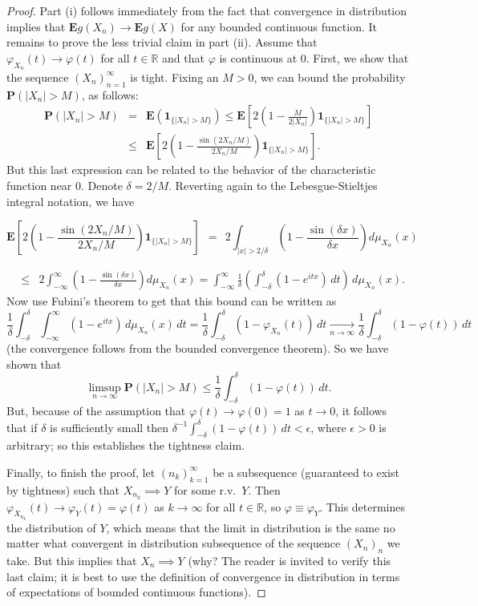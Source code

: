 \documentclass[12pt]{article}
\newcommand{\R}{\mathbb{R}}
\newcommand{\prob}{\mathbf{P}}
\newcommand{\expec}{\mathbf{E}}
\newcommand{\ind}{\textbf{1}}
\theoremstyle{example}
\begin{document}
\begin{proof} Part (i) follows immediately from the fact that convergence in distribution implies that $\expec g(X_n)\to \expec g(X)$ for any bounded continuous function. It remains to prove the less trivial claim in part (ii). Assume that $\varphi_{X_n}(t)\to \varphi(t)$ for all $t\in\R$ and that $\varphi$ is continuous at $0$. First, we show that the sequence $(X_n)_{n=1}^\infty$ is tight. Fixing an $M>0$, we can bound the probability $\prob(|X_n|>M)$, as follows:
\begin{eqnarray*} \prob(|X_n|>M) &=& \expec\left( \ind_{\{|X_n|>M\}}\right) \le
\expec \left[ 2 \left( 1-\frac{M}{2|X_n|} \right) \ind_{\{|X_n|>M\}}\right]
\\ &\le&
\expec \left[ 2 \left( 1-\frac{\sin(2X_n/M)}{2X_n/M} \right) \ind_{\{|X_n|>M\}}\right].
\end{eqnarray*}
But this last expression can be related to the behavior of the characteristic function near $0$. Denote $\delta=2/M$. Reverting again to the Lebesgue-Stieltjes integral notation, we have
\begin{samepage}
$$
\expec \left[ 2 \left( 1-\frac{\sin(2X_n/M)}{2X_n/M} \right) \ind_{\{|X_n|>M\}}\right]
\ \ =\ \  2\int_{|x|>2/\delta} \left(1-\frac{\sin (\delta x)}{\delta x}\right) d\mu_{X_n}(x) 
$$

\vspace{-16.0pt}
\begin{eqnarray*} 
&\le& 2\int_{-\infty}^\infty \left(1-\frac{\sin (\delta x)}{\delta x}\right) d\mu_{X_n}(x) 
= \int_{-\infty}^\infty \frac{1}{\delta}\left(\int_{-\delta}^\delta (1-e^{itx})\,dt\right)\,d\mu_{X_n}(x).
\end{eqnarray*}
Now use Fubini's theorem to get that this bound can be written as
$$
\frac{1}{\delta} \int_{-\delta}^\delta \int_{-\infty}^\infty (1-e^{itx})\,d\mu_{X_n}(x)\,dt
=\frac{1}{\delta} \int_{-\delta}^\delta (1-\varphi_{X_n}(t))\,dt
\xrightarrow[n\to\infty]{} \frac{1}{\delta} \int_{-\delta}^\delta (1-\varphi(t))\,dt
$$
(the convergence follows from the bounded convergence theorem).
So we have shown that
$$ \limsup_{n\to\infty} \prob(|X_n|>M) \le \frac{1}{\delta} \int_{-\delta}^\delta (1-\varphi(t))\,dt. $$
But, because of the assumption that $\varphi(t)\to \varphi(0)=1$ as $t\to 0$, it follows that if $\delta$ is sufficiently small then
$ \delta^{-1} \int_{-\delta}^\delta (1-\varphi(t))\,dt < \epsilon $, where $\epsilon>0$ is arbitrary; so this establishes the tightness claim.
\end{samepage}

Finally, to finish the proof, let $(n_k)_{k=1}^\infty$ be a subsequence (guaranteed to exist by tightness) such that $X_{n_k}\implies Y$ for some r.v.\ $Y$. Then $\varphi_{X_{n_k}}(t)\to \varphi_Y(t)=\varphi(t)$ as $k\to\infty$ for all $t\in\R$, so $\varphi\equiv\varphi_Y$. This determines the distribution of $Y$, which means that the limit in distribution is the same no matter what convergent in distribution subsequence of the sequence $(X_n)_n$ we take. But this implies that $X_n\implies Y$ (why? The reader is invited to verify this last claim; it is best to use the definition of convergence in distribution in terms of expectations of bounded continuous functions).
\end{proof}
\end{document}
